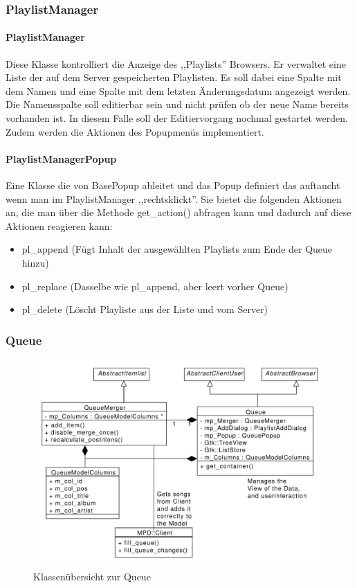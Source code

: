 \subsubsection{PlaylistManager}
\paragraph{PlaylistManager}
Diese Klasse kontrolliert die Anzeige des ,,Playlists'' Browsers. Er verwaltet eine Liste der auf dem Server gespeicherten Playlisten. Es soll dabei eine Spalte mit dem Namen und eine Spalte mit dem letzten Änderungsdatum angezeigt werden.
Die Namensspalte soll editierbar sein und nicht prüfen ob der neue Name bereits vorhanden ist. In diesem Falle soll der Editiervorgang nochmal gestartet werden.
Zudem werden die Aktionen des Popupmenüs implementiert.

\paragraph{PlaylistManagerPopup}
Eine Klasse die von BasePopup ableitet und das Popup definiert das auftaucht wenn man im PlaylistManager ,,rechtsklickt''.
Sie bietet die folgenden Aktionen an, die man über die Methode get\_action() abfragen kann und dadurch auf diese Aktionen reagieren kann:
\begin{itemize}
\item pl\_append (Fügt Inhalt der ausgewählten Playlists zum Ende der Queue hinzu)
\item pl\_replace (Dasselbe wie pl\_append, aber leert vorher Queue)
\item pl\_delete (Löscht Playliste aus der Liste und vom Server)
\end{itemize}

\subsubsection{Queue}
\begin{figure}[htb!]
	\centering
        \includegraphics[width=\textwidth]{QueueClass.pdf}
	\caption{Klassenübersicht zur Queue}
	\label{st_queue}
\end{figure}
